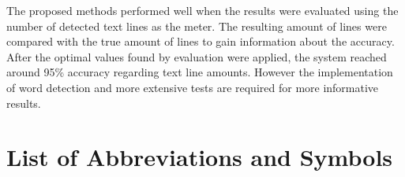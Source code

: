 \documentclass{article}
\begin{document}
    The proposed methods performed well when the results were evaluated using the number of detected text lines as the meter. The resulting amount of lines were compared with the true amount of lines to gain information about the accuracy. After the optimal values found by evaluation were applied, the system reached around 95\% accuracy regarding text line amounts. However the implementation of word detection and more extensive tests are required for more informative results.

   \newpage
   \tableofcontents

   \newpage
   \section*{List of Abbreviations and Symbols}
\end{document}
